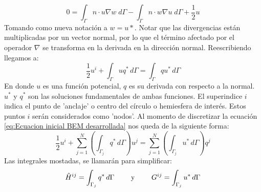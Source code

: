 \documentclass[11pt]{article}
\begin{document}
\begin{equation}
0=\int_\Gamma n\cdot u\nabla w\;d\Gamma-\int_\Gamma n\cdot w\nabla u\;d\Gamma+\frac{1}{2}u
\end{equation}
Tomando como nueva notación a $w=u*$. Notar que las divergencias están multiplicadas por un vector normal, por lo que el término afectado por el operador $\nabla$ se transforma en la derivada en la dirección normal. Reescribiendo llegamos a:
\begin{equation}
\label{eq:Ecuacion inicial BEM desarrollada}
\frac{1}{2}u^i+\int_\Gamma uq^*\,d\Gamma=\int_\Gamma qu^*\,d\Gamma
\end{equation}
En donde $u$ es una función potencial, $q$ es su derivada con respecto a la normal. $u^*$ y $q^*$ son las soluciones fundamentales de ambas funciones. El superindice $i$ indica el punto de 'anclaje' o centro del círculo o hemiesfera de interés.
Estos puntos $i$ serán considerados como 'nodos'. 
Al momento de discretizar la ecuación \eqref{eq:Ecuacion inicial BEM desarrollada} nos queda de la siguiente forma:
\begin{equation}
\label{eq:Ecuacion discretizada}
\frac{1}{2}u^i+\sum_{j=1}^N\left( \int_{\Gamma_j} q^*\,d\Gamma\right)u^j=\sum_{j=1}^N \left(\int_{\Gamma_j} u^*\,d\Gamma \right)q^j
\end{equation}
Las integrales mostadas, se llamarán para simplificar:
\begin{equation}
\label{eq:Descripcion de matriz H y G}
\hat{H}^{ij}=\int_{\Gamma_j}q^*\,d\Gamma\qquad\textnormal{ y }\qquad G^{ij}=\int_{\Gamma_j}u^*\,d\Gamma
\end{equation}	 
\end{document}
